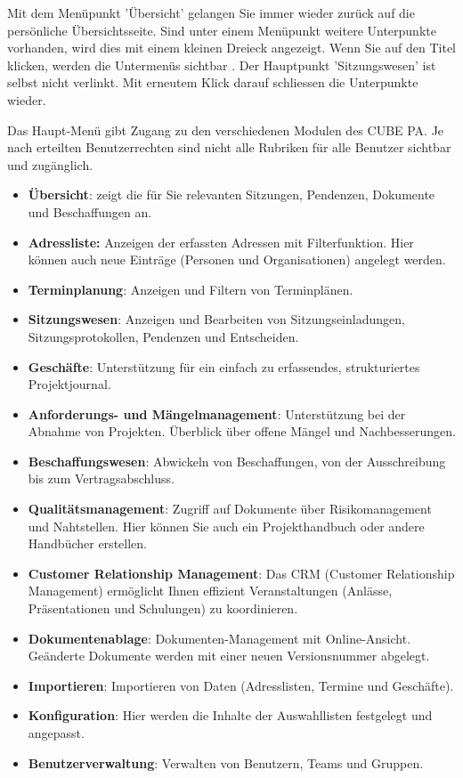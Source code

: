 \vspace{\baselineskip}

Mit dem Menüpunkt 'Übersicht'  gelangen Sie immer wieder zurück auf die persönliche Übersichtsseite. Sind unter einem Menüpunkt weitere Unterpunkte vorhanden, wird dies mit einem kleinen Dreieck angezeigt. Wenn Sie auf den Titel klicken, werden die Untermenüs sichtbar . Der Hauptpunkt 'Sitzungswesen' ist selbst nicht verlinkt. Mit erneutem Klick darauf schliessen die Unterpunkte wieder.

\vspace{\baselineskip}

Das Haupt-Menü gibt Zugang zu den verschiedenen Modulen des CUBE PA. Je nach erteilten Benutzerrechten sind nicht alle Rubriken für alle Benutzer sichtbar und zugänglich.

\begin{itemize}
\item
\textbf{Übersicht}: zeigt die für Sie relevanten Sitzungen, Pendenzen, Dokumente und Beschaffungen an.
\item
\textbf{Adressliste: }Anzeigen der erfassten Adressen mit Filterfunktion. Hier können auch neue Einträge (Personen und Organisationen) angelegt werden.
\item
\textbf{Terminplanung}: Anzeigen und Filtern von Terminplänen.
\item
\textbf{Sitzungswesen}: Anzeigen und Bearbeiten von Sitzungseinladungen, Sitzungsprotokollen, Pendenzen und
Entscheiden.
\item
\textbf{Geschäfte}: Unterstützung für ein einfach zu erfassendes, strukturiertes Projektjournal.
\item
\textbf{Anforderungs- und Mängelmanagement}: Unterstützung bei der Abnahme von Projekten. Überblick über offene Mängel und Nachbesserungen.
\item
\textbf{Beschaffungswesen}: Abwickeln von Beschaffungen, von der Ausschreibung bis zum Vertragsabschluss.
\item
\textbf{Qualitätsmanagement}: Zugriff auf Dokumente über Risikomanagement und Nahtstellen. Hier können Sie auch ein Projekthandbuch oder andere Handbücher erstellen.
\item
\textbf{Customer Relationship Management}: Das CRM (Customer Relationship Management) ermöglicht Ihnen effizient Veranstaltungen (Anlässe, Präsentationen und Schulungen) zu koordinieren.
\item
\textbf{Dokumentenablage}: Dokumenten-Management mit Online-Ansicht. Geänderte Dokumente werden mit einer neuen Versionsnummer abgelegt.
\item
\textbf{Importieren}: Importieren von Daten (Adresslisten, Termine und Geschäfte).
\item
\textbf{Konfiguration}: Hier werden die Inhalte der Auswahllisten festgelegt und angepasst.
\item
\textbf{Benutzerverwaltung}: Verwalten von Benutzern, Teams und Gruppen.
\end{itemize}

